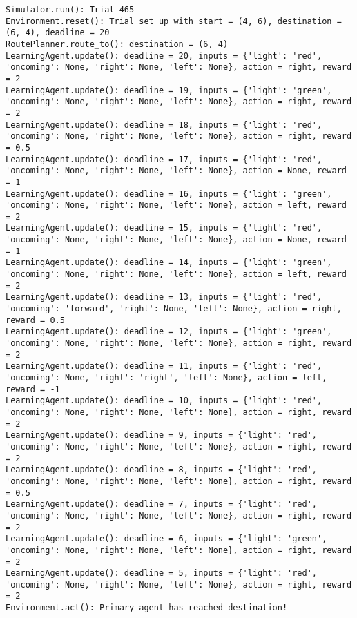 \documentclass{article}
\begin{document}
\begin{verbatim}
Simulator.run(): Trial 465
Environment.reset(): Trial set up with start = (4, 6), destination = (6, 4), deadline = 20
RoutePlanner.route_to(): destination = (6, 4)
LearningAgent.update(): deadline = 20, inputs = {'light': 'red', 'oncoming': None, 'right': None, 'left': None}, action = right, reward = 2
LearningAgent.update(): deadline = 19, inputs = {'light': 'green', 'oncoming': None, 'right': None, 'left': None}, action = right, reward = 2
LearningAgent.update(): deadline = 18, inputs = {'light': 'red', 'oncoming': None, 'right': None, 'left': None}, action = right, reward = 0.5
LearningAgent.update(): deadline = 17, inputs = {'light': 'red', 'oncoming': None, 'right': None, 'left': None}, action = None, reward = 1
LearningAgent.update(): deadline = 16, inputs = {'light': 'green', 'oncoming': None, 'right': None, 'left': None}, action = left, reward = 2
LearningAgent.update(): deadline = 15, inputs = {'light': 'red', 'oncoming': None, 'right': None, 'left': None}, action = None, reward = 1
LearningAgent.update(): deadline = 14, inputs = {'light': 'green', 'oncoming': None, 'right': None, 'left': None}, action = left, reward = 2
LearningAgent.update(): deadline = 13, inputs = {'light': 'red', 'oncoming': 'forward', 'right': None, 'left': None}, action = right, reward = 0.5
LearningAgent.update(): deadline = 12, inputs = {'light': 'green', 'oncoming': None, 'right': None, 'left': None}, action = right, reward = 2
LearningAgent.update(): deadline = 11, inputs = {'light': 'red', 'oncoming': None, 'right': 'right', 'left': None}, action = left, reward = -1
LearningAgent.update(): deadline = 10, inputs = {'light': 'red', 'oncoming': None, 'right': None, 'left': None}, action = right, reward = 2
LearningAgent.update(): deadline = 9, inputs = {'light': 'red', 'oncoming': None, 'right': None, 'left': None}, action = right, reward = 2
LearningAgent.update(): deadline = 8, inputs = {'light': 'red', 'oncoming': None, 'right': None, 'left': None}, action = right, reward = 0.5
LearningAgent.update(): deadline = 7, inputs = {'light': 'red', 'oncoming': None, 'right': None, 'left': None}, action = right, reward = 2
LearningAgent.update(): deadline = 6, inputs = {'light': 'green', 'oncoming': None, 'right': None, 'left': None}, action = right, reward = 2
LearningAgent.update(): deadline = 5, inputs = {'light': 'red', 'oncoming': None, 'right': None, 'left': None}, action = right, reward = 2
Environment.act(): Primary agent has reached destination!
\end{verbatim}
\end{document}
